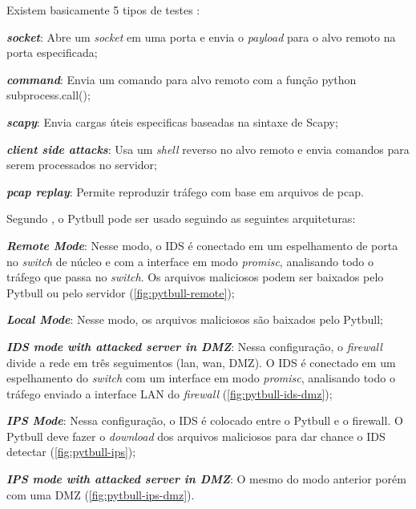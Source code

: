 Existem basicamente 5 tipos de testes \cite{pytbull}: 
\begin{alineas}
\item \textbf{\textit{socket}}: Abre um \textit{socket} em uma porta e envia o \textit{payload} para o alvo remoto na porta especificada; 
\item \textbf{\textit{command}}: Envia um comando para alvo remoto com a função python subprocess.call(); 
\item \textbf{\textit{scapy}}: Envia cargas úteis especificas baseadas na sintaxe de Scapy;
\item \textbf{\textit{client side attacks}}: Usa um \textit{shell} reverso no alvo remoto e envia comandos para serem processados no servidor; 
\item \textbf{\textit{pcap replay}}: Permite reproduzir tráfego com base em arquivos de pcap.
\end{alineas}

Segundo \cite{pytbull}, o Pytbull pode ser usado seguindo as seguintes arquiteturas:

\begin{alineas}
\item \textbf{\textit{Remote Mode}}: Nesse modo, o IDS é conectado em um espelhamento de porta no \textit{switch} de núcleo e com a interface em modo \textit{promisc}, analisando todo o tráfego que passa no \textit{switch}. Os arquivos maliciosos podem ser baixados pelo Pytbull ou pelo servidor (\autoref{fig:pytbull-remote});
\item \textbf{\textit{Local Mode}}: Nesse modo, os arquivos maliciosos são baixados pelo Pytbull;
\item \textbf{\textit{IDS mode with attacked server in DMZ}}: Nessa configuração, o \textit{firewall} divide a rede em três seguimentos (lan, wan, DMZ). O IDS é conectado em um espelhamento do \textit{switch} com um interface em modo \textit{promisc}, analisando todo o tráfego enviado a interface LAN do \textit{firewall} (\autoref{fig:pytbull-ids-dmz});
\item \textbf{\textit{IPS Mode}}: Nessa configuração, o IDS é colocado entre o Pytbull e o firewall. O Pytbull deve fazer o \textit{download} dos arquivos maliciosos para dar chance o IDS detectar (\autoref{fig:pytbull-ips});
\item \textbf{\textit{IPS mode with attacked server in DMZ}}: O mesmo do modo anterior porém com uma DMZ (\autoref{fig:pytbull-ips-dmz}).
\end{alineas}

